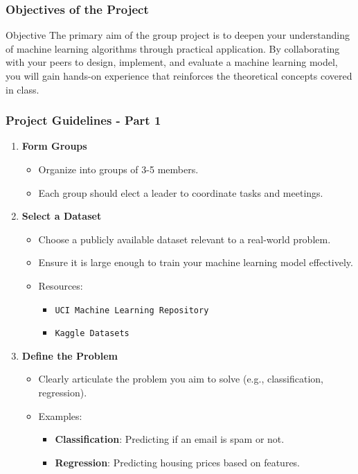 \documentclass[aspectratio=169]{beamer}
\begin{document}
\begin{frame}[fragile]
  \frametitle{Objectives of the Project}
  \begin{block}{Objective}
    The primary aim of the group project is to deepen your understanding of machine learning algorithms through practical application. 
    By collaborating with your peers to design, implement, and evaluate a machine learning model, you will gain hands-on experience that reinforces the theoretical concepts covered in class.
  \end{block}
\end{frame}

\begin{frame}[fragile]
  \frametitle{Project Guidelines - Part 1}
  \begin{enumerate}
    \item \textbf{Form Groups}
    \begin{itemize}
      \item Organize into groups of 3-5 members. 
      \item Each group should elect a leader to coordinate tasks and meetings.
    \end{itemize}

    \item \textbf{Select a Dataset}
    \begin{itemize}
      \item Choose a publicly available dataset relevant to a real-world problem.
      \item Ensure it is large enough to train your machine learning model effectively.
      \item Resources: 
      \begin{itemize}
        \item \texttt{UCI Machine Learning Repository}
        \item \texttt{Kaggle Datasets}
      \end{itemize}
    \end{itemize}

    \item \textbf{Define the Problem}
    \begin{itemize}
      \item Clearly articulate the problem you aim to solve (e.g., classification, regression).
      \item Examples:
      \begin{itemize}
        \item \textbf{Classification}: Predicting if an email is spam or not.
        \item \textbf{Regression}: Predicting housing prices based on features.
      \end{itemize}
    \end{itemize}
  \end{enumerate}
\end{frame}
\end{document}
